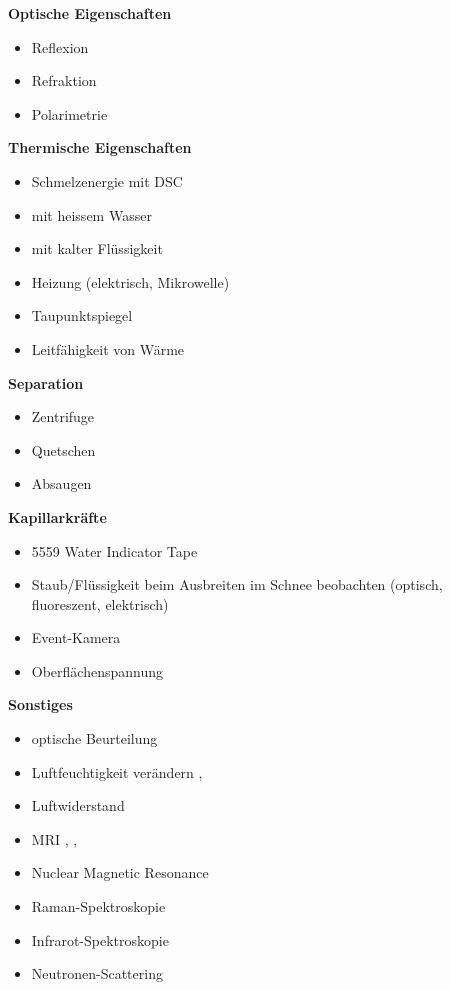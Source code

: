 \begin{multicols}{2}
\textbf{Optische Eigenschaften}
\begin{itemize}
\item Reflexion
\item Refraktion
\item Polarimetrie
\end{itemize}

\columnbreak
\textbf{Thermische Eigenschaften}
\begin{itemize}
\item Schmelzenergie mit DSC \cite{mt-density-meter}
\item mit heissem Wasser \cite{Fasani.2023}
\item mit kalter Flüssigkeit
\item Heizung (elektrisch, Mikrowelle)
\item Taupunktspiegel
\item Leitfähigkeit von Wärme
\end{itemize}

\textbf{Separation}
\begin{itemize}
\item Zentrifuge
\item Quetschen
\item Absaugen
\end{itemize}

\textbf{Kapillarkräfte}
\begin{itemize}
\item 5559 Water Indicator Tape
\item Staub/Flüssigkeit beim Ausbreiten im Schnee beobachten (optisch, fluoreszent, elektrisch) \cite{kennedylabs-download}
\item Event-Kamera
\item Oberflächenspannung \cite{AlamShibly.2017}
\end{itemize}

\textbf{Sonstiges}
\begin{itemize}
\item optische Beurteilung \cite{miro}
\item Luftfeuchtigkeit verändern \cite{joule-thomson-wiki}, \cite{sensirion-sht4xa-sensors}
\item Luftwiderstand
\item MRI \cite{Adachi.2020}, \cite{Nowogrodzki.2018}, \cite{Yamaguchi.2023}
\item Nuclear Magnetic Resonance
\item Raman-Spektroskopie \cite{Reichardt.2022}
\item Infrarot-Spektroskopie
\item Neutronen-Scattering \cite{Lombardo.2023}
\end{itemize}
\end{multicols}
